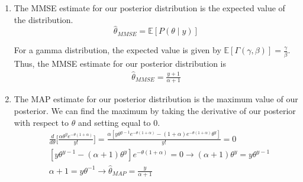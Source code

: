 \documentclass[11pt]{article}
\begin{document}
\begin{enumerate}[label=\alph*)]
    \item 
    The MMSE estimate for our posterior distribution is the expected value of the distribution.
    \[
    \hat{\theta}_{MMSE} = \mathbb{E}[P(\theta\mid y)]
    \]

    For a gamma distribution, the expected value is given by $\mathbb{E}[\Gamma(\gamma,\beta)] = \frac{\gamma}{\beta}$. Thus, the MMSE estimate
    for our posterior distribution is
    \begin{align*}
        \boxed{\hat{\theta}_{MMSE} = \frac{y+1}{\alpha+1}}
    \end{align*}
    \item
    The MAP estimate for our posterior distribution is the maximum value of our posterior. We can find the maximum
    by taking the derivative of our posterior with respect to $\theta$ and setting equal to 0.
    \begin{align*}
        & \frac{d}{d\theta} \Big[\frac{\alpha \theta^y e^{-\theta(1+\alpha)}}{y!}\Big] = \frac{\alpha[y\theta^{y-1}e^{-\theta(1+\alpha)}-(1+\alpha)e^{-\theta(1+\alpha)}\theta^y]}{y!} = 0 \\
        & [y\theta^{y-1}-(\alpha+1)\theta^y]e^{-\theta(1+\alpha)} = 0 \to (\alpha+1)\theta^y = y\theta^{y-1} \\
        & \alpha + 1 = y\theta^{-1} \to \boxed{\hat{\theta}_{MAP} = \frac{y}{\alpha+1}}
    \end{align*}
\end{enumerate}

\section{}
\end{document}
